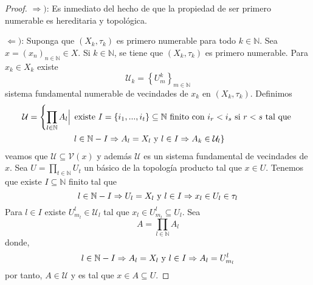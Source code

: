 \documentclass[12pt]{report}
\theoremstyle{largebreak}
\begin{document}
    \begin{proof}
        $\Rightarrow)$: Es inmediato del hecho de que la propiedad de ser primero numerable es hereditaria y topológica.

        $\Leftarrow)$: Suponga que $(X_k,\tau_k)$ es primero numerable para todo $k\in\mathbb{N}$. Sea $x=(x_n)_{n\in\mathbb{N}}\in X$. Si $k\in\mathbb{N}$, se tiene que $(X_k,\tau_k)$ es primero numerable. Para $x_k\in X_k$ existe
        \begin{equation*}
            \mathcal{U}_k=\left\{U_m^k \right\}_{ m\in\mathbb{N}}
        \end{equation*}
        sistema fundamental numerable de vecindades de $x_k$ en $(X_k,\tau_k)$. Definimos
        \begin{equation*}
            \begin{split}
                \mathcal{U}=\left\{\prod_{ l\in\mathbb{N}}A_l\Big|\right.&\textup{ existe }I=\left\{i_1,...,i_t \right\} \subseteq\mathbb{N}\textup{ finito con }i_r<i_s\textup{ si }r<s\textup{ tal que } \\
                &\left.l\in\mathbb{N}-I\Rightarrow A_l=X_l\textup{ y }l\in I\Rightarrow A_k\in\mathcal{U}_l \right\}\\
            \end{split}
        \end{equation*}
        veamos que $\mathcal{U}\subseteq\mathcal{V}(x)$ y además $\mathcal{U}$  es un sistema fundamental de vecindades de $x$. Sea $U=\prod_{t\in\mathbb{N}}U_t$ un básico de la topología producto tal que $x\in U$. Tenemos que existe $I\subseteq\mathbb{N}$ finito tal que
        \begin{equation*}
            l\in\mathbb{N}-I\Rightarrow U_l=X_l\textup{ y }l\in I\Rightarrow x_l\in U_l\in\tau_l
        \end{equation*}
        Para $l\in I$ existe $U_{ m_l}^l\in\mathcal{U}_l$ tal que $x_l\in U_{ m_l}^l\subseteq U_l$. Sea
        \begin{equation*}
            A=\prod_{ l\in\mathbb{N}}A_l
        \end{equation*}
        donde,
        \begin{equation*}
            l\in\mathbb{N}-I\Rightarrow A_l=X_l\textup{ y }l\in I\Rightarrow A_l=U_{ m_l}^l
        \end{equation*}
        por tanto, $A\in\mathcal{U}$ y es tal que $x\in A\subseteq U$.
    \end{proof}
\end{document}

